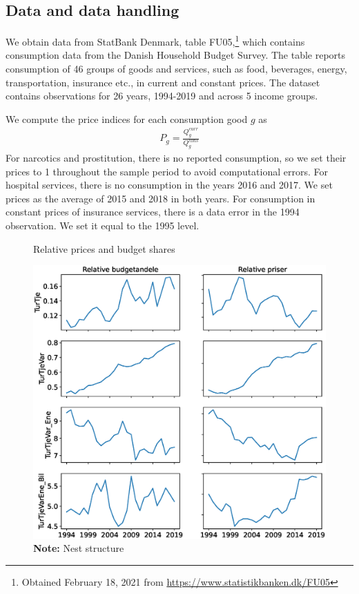 \subsection{Data and data handling}
We obtain data from StatBank Denmark, table FU05,\footnote{Obtained February 18, 2021 from \hyperlink{https://www.statistikbanken.dk/FU05}{https://www.statistikbanken.dk/FU05}} which contains consumption data from the Danish Household Budget Survey. The table reports consumption of 46 groups of goods and services, such as food, beverages, energy, transportation, insurance etc., in current and constant prices. The dataset contains observations for 26 years, 1994-2019 and across 5 income groups.

We compute the price indices for each consumption good $g$ as
\begin{align}
    P_{g} = \frac{Q^{curr}_g}{Q^{cons}_g}
\end{align}
For narcotics and prostitution, there is no reported consumption, so we set their prices to 1 throughout the sample period to avoid computational errors. For hospital services, there is no consumption in the years 2016 and 2017. We set prices as the average of 2015 and 2018 in both years. For consumption in constant prices of insurance services, there is a data error in the 1994 observation. We set it equal to the 1995 level.

\begin{figure}[]
\centering
\caption{Relative prices and budget shares}
\label{fignest}
\includegraphics[width=\textwidth]{Figures/relbudrelp.eps}
\captionsetup{singlelinecheck=off,size=scriptsize}
\setlength{\captionmargin}{10pt}
\caption*{
\textbf{Note:} Nest structure\\}
\end{figure}

